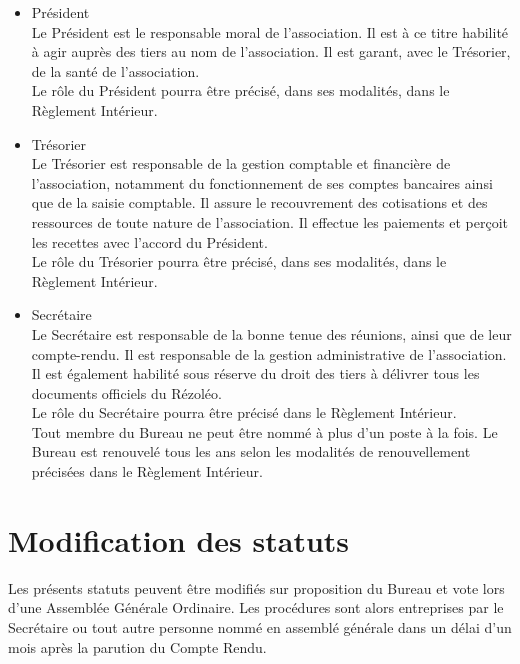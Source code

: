 \documentclass[12pt]{constitution}
\begin{document}
	\begin{itemize}
		\item[\textbullet] Président\\
		 Le Président est le responsable moral de l’association. Il est à ce titre habilité à agir auprès des tiers au nom de l’association. Il est garant, avec le Trésorier, de la santé de l’association.\\
		Le rôle du Président pourra être précisé, dans ses modalités, dans le Règlement Intérieur.
		\item[\textbullet] Trésorier\\
		Le Trésorier est responsable de la gestion comptable et financière de l’association, notamment du fonctionnement de ses comptes bancaires ainsi que de la saisie comptable. Il assure le recouvrement des cotisations et des ressources de toute nature de l’association. Il effectue les paiements et perçoit les recettes avec l’accord du Président.\\
		Le rôle du Trésorier pourra être précisé, dans ses modalités, dans le Règlement Intérieur.

		\item[\textbullet] Secrétaire\\
		Le Secrétaire est responsable de la bonne tenue des réunions, ainsi que de leur compte-rendu. Il est responsable de la gestion administrative de l’association. Il est également habilité sous réserve du droit des tiers à délivrer tous les documents officiels du Rézoléo.\\
		Le rôle du Secrétaire pourra être précisé dans le Règlement Intérieur.\\

		Tout membre du Bureau ne peut être nommé à plus d'un poste à la fois. Le Bureau est renouvelé tous les ans selon les modalités de renouvellement précisées dans le Règlement Intérieur.
	\end{itemize}


	\section{Modification des statuts}
	Les présents statuts peuvent être modifiés sur proposition du Bureau et vote lors d'une Assemblée Générale Ordinaire.
	Les procédures sont alors entreprises par le Secrétaire ou tout autre personne nommé en assemblé générale dans un délai d’un mois après la parution du Compte Rendu.
\end{document}
